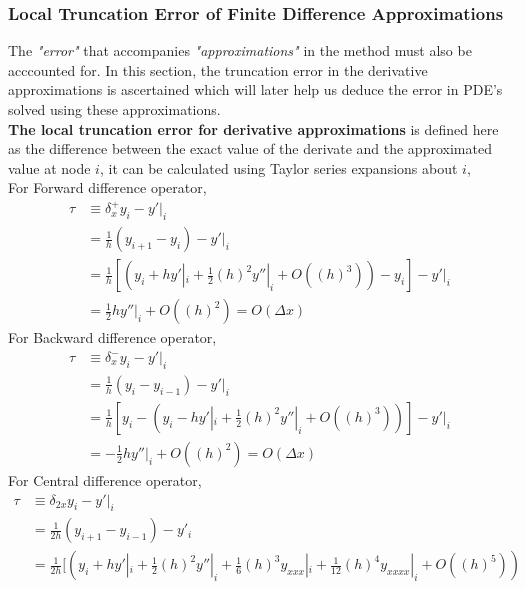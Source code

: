\documentclass[12pt]{article}
\begin{document}
 	\subsubsection{Local Truncation Error of Finite Difference Approximations}
 	The \textit{"error"} that accompanies \textit{"approximations"} in the method must also be acccounted for. In this section, the truncation error in the derivative approximations is ascertained which will later help us deduce the error in PDE's solved using these approximations.
 	\\[2mm]
 	\textbf{The local truncation error for derivative approximations} is defined here as the difference between the exact value of the derivate and the approximated value at node $i$, it can be calculated using Taylor series expansions about $i$,\\[2mm]
 	For Forward difference operator,%
 	\begin{align*}
 		\tau &\equiv \delta _ x^{+} y_i - {y'}|_ i \\
 		&= \frac{1}{h}\left( y_ {i+1} - y_{i}\right) - {y'}|_i \\
 		&= \frac{1}{h}\left[ \left( y_i + h{y'}|_ i + \frac{1}{2}(h)^2{y''}|_ i + O((h)^3)\right) - y_i \right] - {y'}|_ i \\
 		&= \frac{1}{2}h{y''}|_ i + O((h)^2) = O(\Delta x)
 	\end{align*}
 	For Backward difference operator, 
 	\begin{align*}
 		\tau &\equiv \delta _ x^{-} y_i - {y'}|_ i \\
 		&= \frac{1}{h}\left( y_i - y_{i-1}\right) - {y'}|_i \\
 		&= \frac{1}{h}\left[ y_i - \left( y_i - h{y'}|_ i + \frac{1}{2}(h)^2{y''}|_ i + O((h)^3)\right)\right] - {y'}|_ i \\
 		&= -\frac{1}{2}h{y''}|_ i + O((h)^2) = O(\Delta x)  
 	\end{align*}
 	For Central difference operator,
 	\begin{align*}
 		\tau &\equiv \delta _ {2x} y_i - {y'}|_ i \\
 		&= \frac{1}{2h}\left( y_{i+1} - y_{i-1}\right) - y'_i \\
 		&= \frac{1}{2h}\Bigg[ \left( y_i + h{y'}|_ i + \frac{1}{2}(h)^2{y''}|_ i + \frac{1}{6}(h)^3{y_{xxx}}|_ i + \frac{1}{12}(h)^4{y_{xxxx}}|_ i + O((h)^5)\right) \\
 	\end{align*}
\end{document}
